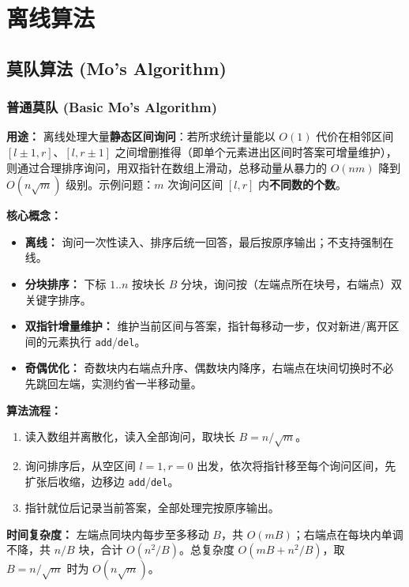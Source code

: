 \section{离线算法}

\subsection{莫队算法 (Mo's Algorithm)}

\subsubsection{普通莫队 (Basic Mo's Algorithm)}

\textbf{用途：}
离线处理大量\textbf{静态区间询问}：若所求统计量能以 $O(1)$ 代价在相邻区间 $[l\pm1,r]$、$[l,r\pm1]$ 之间增删推得（即单个元素进出区间时答案可增量维护），则通过合理排序询问，用双指针在数组上滑动，总移动量从暴力的 $O(nm)$ 降到 $O(n\sqrt{m})$ 级别。示例问题：$m$ 次询问区间 $[l,r]$ 内\textbf{不同数的个数}。

\textbf{核心概念：}
\begin{itemize}
  \item \textbf{离线：} 询问一次性读入、排序后统一回答，最后按原序输出；不支持强制在线。
  \item \textbf{分块排序：} 下标 $1..n$ 按块长 $B$ 分块，询问按（左端点所在块号，右端点）双关键字排序。
  \item \textbf{双指针增量维护：} 维护当前区间与答案，指针每移动一步，仅对新进/离开区间的元素执行 \texttt{add}/\texttt{del}。
  \item \textbf{奇偶优化：} 奇数块内右端点升序、偶数块内降序，右端点在块间切换时不必先跳回左端，实测约省一半移动量。
\end{itemize}

\textbf{算法流程：}
\begin{enumerate}
  \item 读入数组并离散化，读入全部询问，取块长 $B = n/\sqrt{m}$。
  \item 询问排序后，从空区间 $l=1, r=0$ 出发，依次将指针移至每个询问区间，先扩张后收缩，边移边 \texttt{add}/\texttt{del}。
  \item 指针就位后记录当前答案，全部处理完按原序输出。
\end{enumerate}

\textbf{时间复杂度：} 左端点同块内每步至多移动 $B$，共 $O(mB)$；右端点在每块内单调不降，共 $n/B$ 块，合计 $O(n^2/B)$。总复杂度 $O(mB + n^2/B)$，取 $B=n/\sqrt{m}$ 时为 $O(n\sqrt{m})$。

